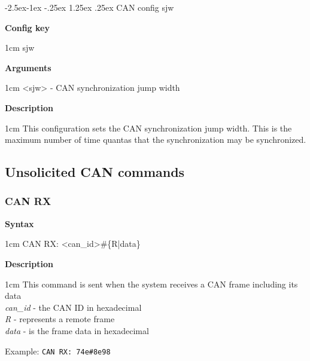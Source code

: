 \documentclass{article}[a4paper]
\makeatletter
\newcommand\subsubsubsection{\@startsection{paragraph}{4}{\z@}%
            {-2.5ex\@plus -1ex \@minus -.25ex}%
            {1.25ex \@plus .25ex}%
            {\normalfont\normalsize\bfseries}}
\makeatother
\begin{document}
\subsubsubsection{CAN config sjw}
\begin{tcolorbox}
	{\bf Config key}

	 1cm \dimexpr\linewidth-2cm\relax
	sjw

	\medskip
	{\bf Arguments}

	 1cm \dimexpr\linewidth-2cm\relax
	<sjw> - CAN synchronization jump width

	\medskip
	{\bf Description}

	 1cm \dimexpr\linewidth-2cm\relax
	This configuration sets the CAN synchronization jump width. This is the
	maximum number of time quantas that the synchronization may be synchronized.
\end{tcolorbox}

\subsection{Unsolicited CAN commands}

\subsubsection{CAN RX}
\begin{tcolorbox}
	{\bf Syntax}

	 1cm \dimexpr\linewidth-2cm\relax
	CAN RX: <can\_id>\#\{R|data\}

	\medskip
	{\bf Description}

	 1cm \dimexpr\linewidth-2cm\relax
	This command is sent when the system receives a CAN frame including its data
	\medskip \\
	{\it can\_id} - the CAN ID in hexadecimal \\
	{\it R} - represents a remote frame \\
	{\it data} - is the frame data in hexadecimal

	\medskip
	Example: \texttt{CAN RX: 74e\#8e98}
\end{tcolorbox}



\begin{comment}

\section{LIN}
LIN commands
------------
LIN send <id>
LIN set txbuffer <n> <data>     - empty <data> disables TX buffer

Unsolicited commands:
LIN frame
error?

\end{comment}
\end{document}
